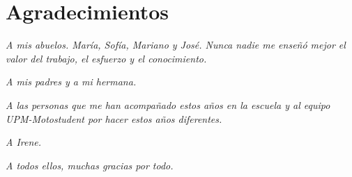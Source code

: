 \chapter{Agradecimientos}

\textit{A mis abuelos. María, Sofía, Mariano y José. Nunca nadie me enseñó mejor el valor del trabajo, el esfuerzo y el conocimiento.}

\textit{A mis padres y a mi hermana.}

\textit{A las personas que me han acompañado estos años en la escuela y al equipo UPM-Motostudent por hacer estos años diferentes.}

\textit{A Irene.}

\textit{A todos ellos, muchas gracias por todo.}